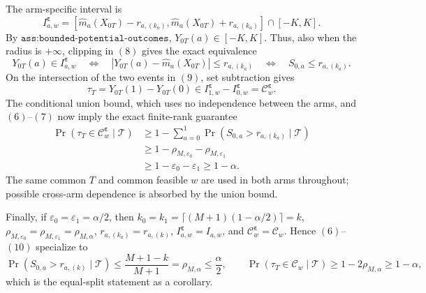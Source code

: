 The arm-specific interval is
\[
I^{\boldsymbol\varepsilon}_{a,w}=\left[\widehat m_a(X_{0T})-r_{a,(k_a)},\widehat m_a(X_{0T})+r_{a,(k_a)}\right]\cap[-K,K].
\tag{8}
\]
By \(\texttt{ass:bounded-potential-outcomes}\), \(Y_{0T}(a)\in[-K,K]\). Thus, also when the radius is \(+\infty\), clipping in \((8)\) gives the exact equivalence
\[
Y_{0T}(a)\in I^{\boldsymbol\varepsilon}_{a,w}\quad\Longleftrightarrow\quad |Y_{0T}(a)-\widehat m_a(X_{0T})|\le r_{a,(k_a)}\quad\Longleftrightarrow\quad S_{0,a}\le r_{a,(k_a)}.
\tag{9}
\]
On the intersection of the two events in \((9)\), set subtraction gives
\[
\tau_T=Y_{0T}(1)-Y_{0T}(0)\in I^{\boldsymbol\varepsilon}_{1,w}-I^{\boldsymbol\varepsilon}_{0,w}=\mathcal C^{\boldsymbol\varepsilon}_w.
\]
The conditional union bound, which uses no independence between the arms, and \((6)\)--\((7)\) now imply the exact finite-rank guarantee
\[
\begin{aligned}
\Pr\!\left(\tau_T\in\mathcal C^{\boldsymbol\varepsilon}_w\mid\mathcal T\right)
&\ge 1-\sum_{a=0}^1\Pr\!\left(S_{0,a}>r_{a,(k_a)}\mid\mathcal T\right)\\
&\ge 1-\rho_{M,\varepsilon_0}-\rho_{M,\varepsilon_1}\\
&\ge 1-\varepsilon_0-\varepsilon_1\ge1-\alpha.
\end{aligned}
\tag{10}
\]
The same common \(T\) and common feasible \(w\) are used in both arms throughout; possible cross-arm dependence is absorbed by the union bound.

Finally, if \(\varepsilon_0=\varepsilon_1=\alpha/2\), then \(k_0=k_1=\lceil(M+1)(1-\alpha/2)\rceil=k\), \(\rho_{M,\varepsilon_0}=\rho_{M,\varepsilon_1}=\rho_{M,\alpha}\), \(r_{a,(k_a)}=r_{a,(k)}\), \(I^{\boldsymbol\varepsilon}_{a,w}=I_{a,w}\), and \(\mathcal C^{\boldsymbol\varepsilon}_w=\mathcal C_w\). Hence \((6)\)--\((10)\) specialize to
\[
\Pr(S_{0,a}>r_{a,(k)}\mid\mathcal T)\le\frac{M+1-k}{M+1}=\rho_{M,\alpha}\le\frac{\alpha}{2},\qquad \Pr(\tau_T\in\mathcal C_w\mid\mathcal T)\ge1-2\rho_{M,\alpha}\ge1-\alpha,
\]
which is the equal-split statement as a corollary.
